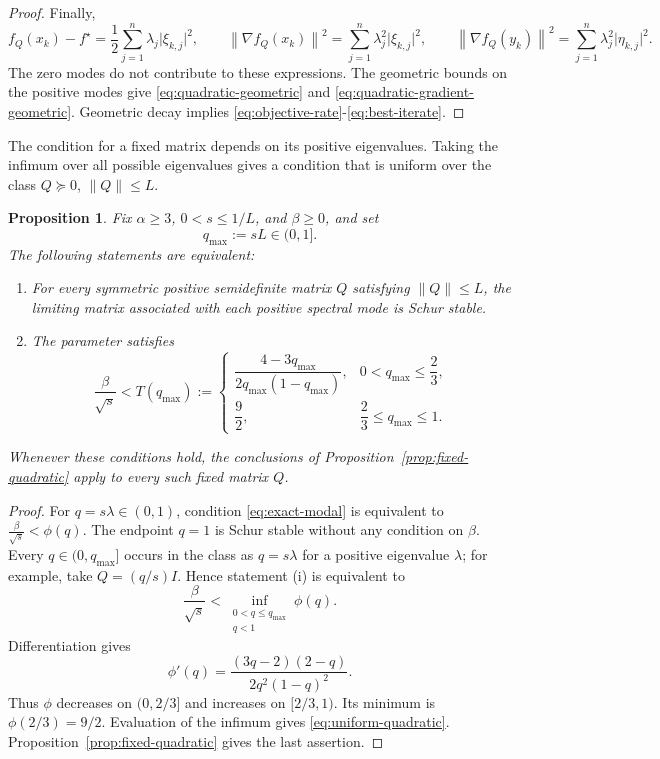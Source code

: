 \documentclass[11pt]{article}
\theoremstyle{plain}
\newtheorem{proposition}[theorem]{Proposition}
\theoremstyle{definition}
\newcommand{\norm}[1]{\left\lVert #1\right\rVert}
\begin{document}
{\begin{proof}
Finally,
$$
f_Q(x_k)-f^\star
=\frac12\sum_{j=1}^n\lambda_j\lvert\xi_{k,j}\rvert^2, \qquad
\norm{\nabla f_Q(x_k)}^2
=\sum_{j=1}^n\lambda_j^2\lvert\xi_{k,j}\rvert^2,
\qquad
\norm{\nabla f_Q(y_k)}^2
=\sum_{j=1}^n\lambda_j^2\lvert\eta_{k,j}\rvert^2.
$$
The zero modes do not contribute to these expressions. The geometric bounds
on the positive modes give \eqref{eq:quadratic-geometric} and
\eqref{eq:quadratic-gradient-geometric}. Geometric decay implies
\eqref{eq:objective-rate}-\eqref{eq:best-iterate}.
\end{proof}

The condition for a fixed matrix depends on its positive eigenvalues. Taking
the infimum over all possible eigenvalues gives a condition that is uniform
over the class $Q\succeq0$, $\norm{Q}\leq L$.

\begin{proposition}
\label{prop:uniform-quadratic}
Fix $\alpha\geq3$, $0<s\leq1/L$, and $\beta\geq0$, and set
$$
q_{\max}:=sL\in(0,1].
$$
The following statements are equivalent:
\begin{enumerate}[leftmargin=*,label=\textup{(\roman*)}]
\item For every symmetric positive semidefinite matrix $Q$ satisfying
$\norm{Q}\leq L$, the limiting matrix associated with each positive spectral
mode is Schur stable.
\item The parameter satisfies
\begin{equation}
\label{eq:uniform-quadratic}
\frac{\beta}{\sqrt{s}}<T(q_{\max}):=
\begin{cases}
\dfrac{4-3q_{\max}}{2q_{\max}(1-q_{\max})},
&0<q_{\max}\leq\dfrac23,\\[2mm]
\dfrac92,&\dfrac23\leq q_{\max}\leq1.
\end{cases}
\end{equation}
\end{enumerate}
Whenever these conditions hold, the conclusions of
Proposition~\ref{prop:fixed-quadratic} apply to every such fixed matrix $Q$.
\end{proposition}

\begin{proof}
For $q=s\lambda\in(0,1)$, condition \eqref{eq:exact-modal} is equivalent to $
\frac{\beta}{\sqrt{s}}<\phi(q).
$
The endpoint $q=1$ is Schur stable without any condition on $\beta$. Every $q\in(0,q_{\max}]$ occurs in the class as $q=s\lambda$ for a
positive eigenvalue $\lambda$; for example, take $Q=(q/s)I$. Hence statement
\textup{(i)} is equivalent
to
$$
\frac{\beta}{\sqrt{s}}
<\inf_{\substack{0<q\leq q_{\max}\\q<1}}\phi(q).
$$
Differentiation gives
$$
\phi'(q)=
\frac{(3q-2)(2-q)}{2q^2(1-q)^2}.
$$
Thus $\phi$ decreases on $(0,2/3]$ and increases on $[2/3,1)$. Its minimum
is $\phi(2/3)=9/2$. Evaluation of the infimum gives
\eqref{eq:uniform-quadratic}. Proposition~\ref{prop:fixed-quadratic} gives the
last assertion.
\end{proof}

}
\end{document}
